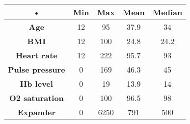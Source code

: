 \begin{tabular}{|c|c|c|c|c|}
\hline 
• & \textbf{Min} & \textbf{Max} & \textbf{Mean} & \textbf{Median} \\ 
\hline 
\textbf{Age} & 12 & 95 & 37.9 & 34 \\ 
\hline 
\textbf{BMI} & 12 & 100 & 24.8 & 24.2 \\ 
\hline 
\textbf{Heart rate} & 12 & 222 & 95.7 & 93 \\ 
\hline 
\textbf{Pulse pressure} & 0 & 169 & 46.3 & 45 \\ 
\hline 
\textbf{Hb level} & 0 & 19 & 13.9 & 14 \\ 
\hline 
\textbf{O2 saturation} & 0 & 100 & 96.5 & 98 \\ 
\hline 
\textbf{Expander} & 0 & 6250 & 791 & 500 \\ 
\hline 
\end{tabular} 